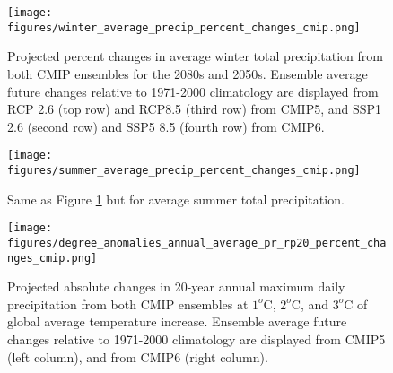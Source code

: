 \documentclass[]{scrartcl}
\begin{document}
\begin{figure}[ht!]
	\centering
	\texttt{[image: figures/winter\_average\_precip\_percent\_changes\_cmip.png]}
	\caption[Pr]{Projected percent changes in average winter total precipitation from both CMIP ensembles for the 2080s and 2050s. Ensemble average future changes relative to 1971-2000 climatology are displayed from RCP 2.6 (top row) and RCP8.5 (third row) from CMIP5, and SSP1 2.6 (second row) and SSP5 8.5 (fourth row) from CMIP6.}
	\label{fig:win_pr_future}
\end{figure}

\begin{figure}[ht!]
	\centering
	\texttt{[image: figures/summer\_average\_precip\_percent\_changes\_cmip.png]}
	\caption[Pr]{Same as Figure \ref{fig:win_pr_future} but for average summer total precipitation.}
	\label{fig:summer_pr_future}
\end{figure}




\begin{figure}[ht!]
	\centering
	\texttt{[image: figures/degree\_anomalies\_annual\_average\_pr\_rp20\_percent\_changes\_cmip.png]}
	\caption[Pr]{Projected absolute changes in 20-year annual maximum daily precipitation from both CMIP ensembles at $1^o$C, $2^o$C, and $3^o$C of global average temperature increase. Ensemble average future changes relative to 1971-2000 climatology are displayed from CMIP5 (left column), and from CMIP6 (right column).}
	\label{fig:ext_pr20_deg_anoms}
\end{figure}
\end{document}
